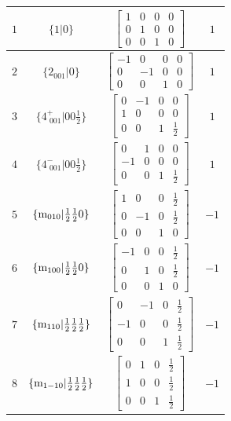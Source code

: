 \documentclass[fleqn,8pt]{jsarticle}
\begin{document}
\begin{longtable}{cccc}
$ 1 $ & $ \{1|0\} $ & $ \begin{bmatrix} 1 & 0 & 0 & 0 \\ 0 & 1 & 0 & 0 \\ 0 & 0 & 1 & 0 \end{bmatrix} $ & $ 1 $ \\ \hline
$ 2 $ & $ \{2{}_{001}|0\} $ & $ \begin{bmatrix} -1 & 0 & 0 & 0 \\ 0 & -1 & 0 & 0 \\ 0 & 0 & 1 & 0 \end{bmatrix} $ & $ 1 $ \\ \hline
$ 3 $ & $ \{4^{+}_{\,\,001}|0 0 \frac{1}{2}\} $ & $ \begin{bmatrix} 0 & -1 & 0 & 0 \\ 1 & 0 & 0 & 0 \\ 0 & 0 & 1 & \frac{1}{2} \end{bmatrix} $ & $ 1 $ \\ \hline
$ 4 $ & $ \{4^{-}_{\,\,001}|0 0 \frac{1}{2}\} $ & $ \begin{bmatrix} 0 & 1 & 0 & 0 \\ -1 & 0 & 0 & 0 \\ 0 & 0 & 1 & \frac{1}{2} \end{bmatrix} $ & $ 1 $ \\ \hline
$ 5 $ & $ \{{\rm m}_{010}|\frac{1}{2} \frac{1}{2} 0\} $ & $ \begin{bmatrix} 1 & 0 & 0 & \frac{1}{2} \\ 0 & -1 & 0 & \frac{1}{2} \\ 0 & 0 & 1 & 0 \end{bmatrix} $ & $ -1 $ \\ \hline
$ 6 $ & $ \{{\rm m}_{100}|\frac{1}{2} \frac{1}{2} 0\} $ & $ \begin{bmatrix} -1 & 0 & 0 & \frac{1}{2} \\ 0 & 1 & 0 & \frac{1}{2} \\ 0 & 0 & 1 & 0 \end{bmatrix} $ & $ -1 $ \\ \hline
$ 7 $ & $ \{{\rm m}_{110}|\frac{1}{2} \frac{1}{2} \frac{1}{2}\} $ & $ \begin{bmatrix} 0 & -1 & 0 & \frac{1}{2} \\ -1 & 0 & 0 & \frac{1}{2} \\ 0 & 0 & 1 & \frac{1}{2} \end{bmatrix} $ & $ -1 $ \\ \hline
$ 8 $ & $ \{{\rm m}_{1-10}|\frac{1}{2} \frac{1}{2} \frac{1}{2}\} $ & $ \begin{bmatrix} 0 & 1 & 0 & \frac{1}{2} \\ 1 & 0 & 0 & \frac{1}{2} \\ 0 & 0 & 1 & \frac{1}{2} \end{bmatrix} $ & $ -1 $ \\
\end{longtable}
\end{document}
